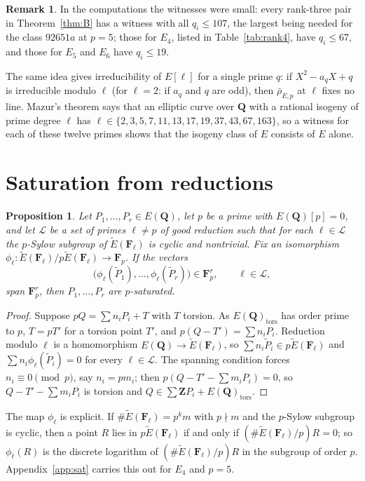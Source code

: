 \documentclass[11pt]{amsart}
\newtheorem{proposition}[theorem]{Proposition}
\theoremstyle{definition}
\newtheorem{remark}[theorem]{Remark}
\newcommand{\Q}{\mathbf{Q}}
\newcommand{\Z}{\mathbf{Z}}
\newcommand{\F}{\mathbf{F}}
\newcommand{\rhobar}{\bar\rho_{E,p}}
\newcommand{\tors}{\mathrm{tors}}
\begin{document}
\begin{remark}
In the computations the witnesses were small: every rank-three pair in Theorem~\ref{thm:B} has a witness with all $q_i\le107$, the largest being needed for the class $92651a$ at $p=5$; those for $E_4$, listed in Table~\ref{tab:rank4}, have $q_i\le67$, and those for $E_5$ and $E_6$ have $q_i\le19$.
\end{remark}


The same idea gives irreducibility of $E[\ell]$ for a single prime $q$: if $X^2-a_qX+q$ is irreducible modulo $\ell$ (for $\ell=2$: if $a_q$ and $q$ are odd), then $\rhobar$ at $\ell$ fixes no line. Mazur's theorem \cite{Maz78} says that an elliptic curve over $\Q$ with a rational isogeny of prime degree $\ell$ has $\ell\in\{2,3,5,7,11,13,17,19,37,43,67,163\}$, so a witness for each of these twelve primes shows that the isogeny class of $E$ consists of $E$ alone.

\section{Saturation from reductions}\label{sec:sat}

\begin{proposition}\label{prop:sat}
Let $P_1,\dots,P_r\in E(\Q)$, let $p$ be a prime with $E(\Q)[p]=0$, and let $\mathcal L$ be a set of primes $\ell\neq p$ of good reduction such that for each $\ell\in\mathcal L$ the $p$-Sylow subgroup of $\tilde E(\F_\ell)$ is cyclic and nontrivial. Fix an isomorphism $\phi_\ell\colon\tilde E(\F_\ell)/p\tilde E(\F_\ell)\to\F_p$. If the vectors
\[
\bigl(\phi_\ell(\tilde P_1),\dots,\phi_\ell(\tilde P_r)\bigr)\in\F_p^r,\qquad\ell\in\mathcal L,
\]
span $\F_p^r$, then $P_1,\dots,P_r$ are $p$-saturated.
\end{proposition}

\begin{proof}
Suppose $pQ=\sum n_iP_i+T$ with $T$ torsion. As $E(\Q)_\tors$ has order prime to $p$, $T=pT'$ for a torsion point $T'$, and $p(Q-T')=\sum n_iP_i$. Reduction modulo $\ell$ is a homomorphism $E(\Q)\to\tilde E(\F_\ell)$, so $\sum n_i\tilde P_i\in p\tilde E(\F_\ell)$ and $\sum n_i\phi_\ell(\tilde P_i)=0$ for every $\ell\in\mathcal L$. The spanning condition forces $n_i\equiv0\pmod p$, say $n_i=pm_i$; then $p(Q-T'-\sum m_iP_i)=0$, so $Q-T'-\sum m_iP_i$ is torsion and $Q\in\sum\Z P_i+E(\Q)_\tors$.
\end{proof}

The map $\phi_\ell$ is explicit. If $\#\tilde E(\F_\ell)=p^km$ with $p\nmid m$ and the $p$-Sylow subgroup is cyclic, then a point $R$ lies in $p\tilde E(\F_\ell)$ if and only if $(\#\tilde E(\F_\ell)/p)R=0$; so $\phi_\ell(R)$ is the discrete logarithm of $(\#\tilde E(\F_\ell)/p)R$ in the subgroup of order $p$. Appendix~\ref{app:sat} carries this out for $E_4$ and $p=5$.
\end{document}
